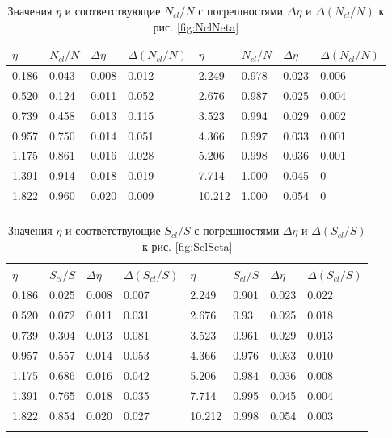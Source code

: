 {\footnotesize
\begin{longtable}{| l | l | l | l || l | l | l | l |}
	\hline
	$\eta$	&	$N_{cl}/N$	&	$\Delta \eta$	&	$\Delta (N_{cl}/N)$	&	$\eta$	&	$N_{cl}/N$	&	$\Delta \eta$	&	$\Delta (N_{cl}/N)$	\\
	\hline
	0.186	&	0.043	&	0.008	&	0.012	&	2.249	&	0.978	&	0.023	&	0.006	\\
	0.520	&	0.124	&	0.011	&	0.052	&	2.676	&	0.987	&	0.025	&	0.004	\\
	0.739	&	0.458	&	0.013	&	0.115	&	3.523	&	0.994	&	0.029	&	0.002	\\
	0.957	&	0.750	&	0.014	&	0.051	&	4.366	&	0.997	&	0.033	&	0.001	\\
	1.175	&	0.861	&	0.016	&	0.028	&	5.206	&	0.998	&	0.036	&	0.001	\\
	1.391	&	0.914	&	0.018	&	0.019	&	7.714	&	1.000	&	0.045	&	0	\\
	1.822	&	0.960	&	0.020	&	0.009	&	10.212	&	1.000	&	0.054	&	0	\\
	\hline
	\caption{Значения $\eta$ и соответствующие $N_{cl}/N$ с погрешностями $\Delta \eta$ и $\Delta (N_{cl}/N)$ к рис. \ref{fig:NclNeta}} \label{tab:NclNeta}
\end{longtable}}

{\footnotesize
\begin{longtable}{| l | l | l | l || l | l | l | l |}
	\hline
	$\eta$	&	$S_{cl}/S$	&	$\Delta \eta$	&	$\Delta (S_{cl}/S)$	&	$\eta$	&	$S_{cl}/S$	&	$\Delta \eta$	&	$\Delta (S_{cl}/S)$	\\
	\hline
	0.186	&	0.025	&	0.008	&	0.007	&	2.249	&	0.901	&	0.023	&	0.022	\\
	0.520	&	0.072	&	0.011	&	0.031	&	2.676	&	0.93	&	0.025	&	0.018	\\
	0.739	&	0.304	&	0.013	&	0.081	&	3.523	&	0.961	&	0.029	&	0.013	\\
	0.957	&	0.557	&	0.014	&	0.053	&	4.366	&	0.976	&	0.033	&	0.010	\\
	1.175	&	0.686	&	0.016	&	0.042	&	5.206	&	0.984	&	0.036	&	0.008	\\
	1.391	&	0.765	&	0.018	&	0.035	&	7.714	&	0.995	&	0.045	&	0.004	\\
	1.822	&	0.854	&	0.020	&	0.027	&	10.212	&	0.998	&	0.054	&	0.003	\\
	\hline
	\caption{Значения $\eta$ и соответствующие $S_{cl}/S$ с погрешностями $\Delta \eta$ и $\Delta (S_{cl}/S)$ к рис. \ref{fig:SclSeta}} \label{tab:SclSeta}
\end{longtable}}

